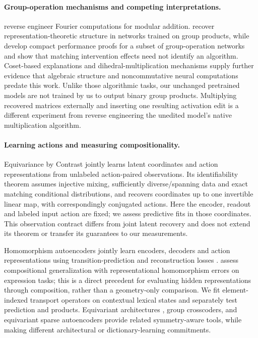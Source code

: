 \paragraph{Group-operation mechanisms and competing interpretations.}
\citet{nanda2023progress} reverse engineer Fourier computations for modular addition. \citet{chughtai2023toy} recover representation-theoretic structure in networks trained on group products, while \citet{wu2025unified} develop compact performance proofs for a subset of group-operation networks and show that matching intervention effects need not identify an algorithm. Coset-based explanations \citep{stander2024cosets} and dihedral-multiplication mechanisms \citep{wei2026dihedral} supply further evidence that algebraic structure and noncommutative neural computations predate this work. Unlike those algorithmic tasks, our unchanged pretrained models are not trained by us to output binary group products. Multiplying recovered matrices externally and inserting one resulting activation edit is a different experiment from reverse engineering the unedited model's native multiplication algorithm.

\paragraph{Learning actions and measuring compositionality.}
Equivariance by Contrast \citep{schmidt2025equivariance} jointly learns latent coordinates and action representations from unlabeled action-paired observations. Its identifiability theorem assumes injective mixing, sufficiently diverse/spanning data and exact matching conditional distributions, and recovers coordinates up to one invertible linear map, with correspondingly conjugated actions. Here the encoder, readout and labeled input action are fixed; we assess predictive fits in those coordinates. This observation contract differs from joint latent recovery and does not extend its theorem or transfer its guarantees to our measurements.

Homomorphism autoencoders jointly learn encoders, decoders and action representations using transition-prediction and reconstruction losses \citep{keurti2023homomorphism}. \citet{an2026homomorphism} assess compositional generalization with representational homomorphism errors on expression tasks; this is a direct precedent for evaluating hidden representations through composition, rather than a geometry-only comparison. We fit element-indexed transport operators on contextual lexical states and separately test prediction and products. Equivariant architectures \citep{cohen2016group,kondor2018generalization,weiler2019general}, group crosscoders, and equivariant sparse autoencoders \citep{gorton2024group,erdogan2025group} provide related symmetry-aware tools, while making different architectural or dictionary-learning commitments.


